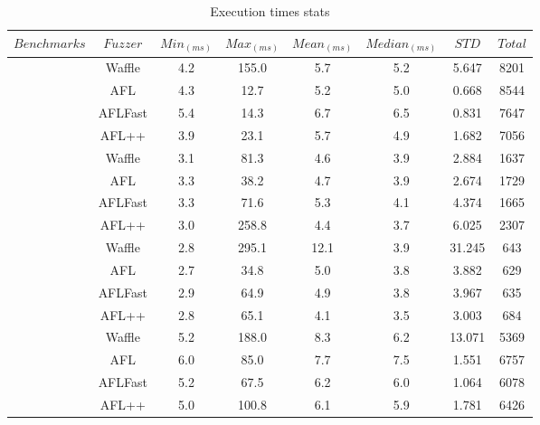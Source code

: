 \begin{table}[!t]
    \begin{adjustbox}{angle=90}
        {\setlength{\extrarowheight}{1ex}%
        \begin{tabular}{|c|c|c|c|c|c|c|c|} 
            \hline
            $Benchmarks$   & $Fuzzer$ & $Min_{(ms)}$ & $Max_{(ms)}$ & $Mean_{(ms)}$ & $Median_{(ms)}$ & $STD$ & $Total$ \\
            \hline
            \rowcolor{gray!20} \multirow{4}{*}{freetype} 
            & Waffle & 4.2 & 155.0 & 5.7 & 5.2 & 5.647 & 8201\\ \cline{2-8}
            & AFL & 4.3 & 12.7 & 5.2 & 5.0 & 0.668 & 8544 \\ \cline{2-8}
            & AFLFast & 5.4 & 14.3 & 6.7 & 6.5 & 0.831 & 7647 \\ \cline{2-8}
            & AFL++ & 3.9 & 23.1 & 5.7 & 4.9 & 1.682 & 7056 \\ \cline{2-8}
            \hline
            \rowcolor{gray!20} \multirow{4}{*}{libjpeg}
            & Waffle   & 3.1 & 81.3 & 4.6 & 3.9 & 2.884 & 1637 \\ \cline{2-8}
            & AFL   & 3.3 & 38.2 & 4.7 & 3.9 & 2.674 & 1729 \\ \cline{2-8}
            & AFLFast   & 3.3 & 71.6 & 5.3 & 4.1 & 4.374 & 1665 \\ \cline{2-8}
            & AFL++   & 3.0 & 258.8 & 4.4 & 3.7 & 6.025 & 2307 \\ \cline{2-8}
            \hline
            \rowcolor{gray!20} \multirow{4}{*}{libpng}
            & Waffle    & 2.8 & 295.1 & 12.1 & 3.9 & 31.245 & 643 \\ \cline{2-8}
            & AFL    & 2.7 & 34.8 & 5.0 & 3.8 & 3.882 & 629 \\ \cline{2-8}
            & AFLFast    & 2.9 & 64.9 & 4.9 & 3.8 & 3.967 & 635 \\ \cline{2-8}
            & AFL++    & 2.8 & 65.1 & 4.1 & 3.5 & 3.003 & 684 \\ \cline{2-8}
            \hline
            \rowcolor{gray!20} \multirow{4}{*}{libxml} 
            & Waffle    & 5.2 & 188.0 & 8.3 & 6.2 & 13.071 & 5369 \\ \cline{2-8}
            & AFL    & 6.0 & 85.0 & 7.7 & 7.5 & 1.551 & 6757 \\ \cline{2-8}
            & AFLFast    & 5.2 & 67.5 & 6.2 & 6.0 & 1.064 & 6078 \\ \cline{2-8}
            & AFL++    & 5.0 & 100.8 & 6.1 & 5.9 & 1.781 & 6426 \\ \cline{2-8}
            \hline
        \end{tabular}
        }
    \end{adjustbox}
    \caption{Execution times stats}
    \label{table:all-exe}
\end{table}

